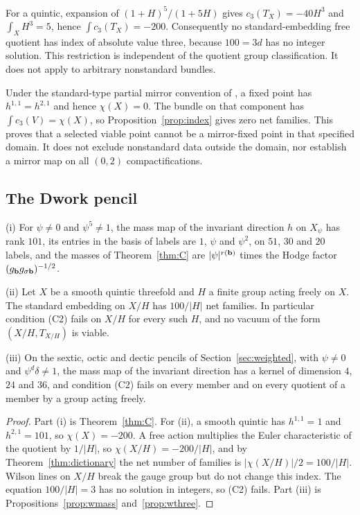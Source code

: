 For a quintic, expansion of $(1+H)^5/(1+5H)$ gives
$c_3(T_X)=-40H^3$ and $\int_XH^3=5$, hence $\int c_3(T_X)=-200$.
Consequently no standard-embedding
free quotient has index of absolute value three, because $100=3d$ has no
integer solution. This restriction is independent of the quotient group
classification. It does not apply to arbitrary nonstandard bundles.

Under the standard-type partial mirror convention of \cite{Mirror}, a
fixed point has $h^{1,1}=h^{2,1}$ and hence $\chi(X)=0$. The bundle on
that component has $\int c_3(V)=\chi(X)$, so Proposition~\ref{prop:index}
gives zero net families. This proves that a selected viable point cannot
be a mirror-fixed point in that specified domain. It does not exclude
nonstandard data outside the domain, nor establish a mirror map on all
$(0,2)$ compactifications.



\subsection{The Dwork pencil}

\begin{proposition}\label{prop:dworkselect}
\textup{(i)} For $\psi\ne0$ and $\psi^5\ne1$, the mass map of the invariant
direction $h$ on $X_\psi$ has rank $101$, its entries in the basis of
labels are $1$, $\psi$ and $\psi^2$, on $51$, $30$ and $20$ labels, and the
masses of Theorem~\ref{thm:C} are $|\psi|^{r(\mathbf{b})}$ times the Hodge factor
$(g_{\mathbf{b}}g_{\sigma\mathbf{b}})^{-1/2}$.

\textup{(ii)} Let $X$ be a smooth quintic threefold and $H$ a finite group
acting freely on $X$. The standard embedding on $X/H$ has
$100/|H|$ net families. In particular condition \textup{(C2)} fails on
$X/H$ for every such $H$, and no vacuum of the form $(X/H,T_{X/H})$ is
viable.

\textup{(iii)} On the sextic, octic and dectic pencils of
Section~\ref{sec:weighted}, with $\psi\ne0$ and $\psi^d\delta\ne1$, the
mass map of the invariant direction has a kernel of dimension $4$, $24$ and
$36$, and condition \textup{(C2)} fails on every member and on every
quotient of a member by a group acting freely.
\end{proposition}

\begin{proof}
Part (i) is Theorem~\ref{thm:C}. For (ii), a smooth quintic has
$h^{1,1}=1$ and $h^{2,1}=101$, so $\chi(X)=-200$. A free action multiplies
the Euler characteristic of the quotient by $1/|H|$, so
$\chi(X/H)=-200/|H|$, and by Theorem~\ref{thm:dictionary} the net number of
families is $|\chi(X/H)|/2=100/|H|$. Wilson lines on $X/H$ break the gauge
group but do not change this index. The equation $100/|H|=3$ has no
solution in integers, so (C2) fails. Part (iii) is
Propositions~\ref{prop:wmass} and~\ref{prop:wthree}.
\end{proof}

